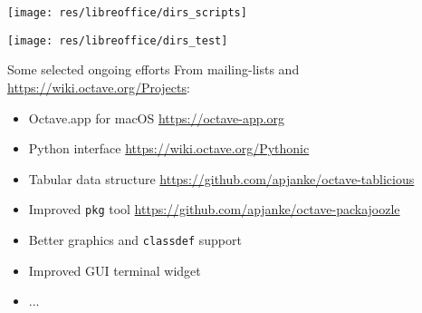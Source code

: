 \begin{frame}
\begin{center}
\texttt{[image: res/libreoffice/dirs\_scripts]}
\end{center}
\end{frame}


\begin{frame}
\begin{center}
\texttt{[image: res/libreoffice/dirs\_test]}
\end{center}
\end{frame}


\begin{frame}{Some selected ongoing efforts}
From mailing-lists
and {\color{DarkBlue}\url{https://wiki.octave.org/Projects}}:\\[1em]
\begin{itemize}
\itemsep1em
\item
Octave.app for macOS
\hfill{\scriptsize\color{DarkBlue} \url{https://octave-app.org}}
\item
Python interface
\hfill{\scriptsize\color{DarkBlue} \url{https://wiki.octave.org/Pythonic}}
\item
Tabular data structure
\hfill{\scriptsize\color{DarkBlue}
\url{https://github.com/apjanke/octave-tablicious}}
\item
Improved \texttt{pkg} tool
\hfill{\scriptsize\color{DarkBlue}
\url{https://github.com/apjanke/octave-packajoozle}}
\item
Better graphics and \texttt{classdef} support
\item
Improved GUI terminal widget
\item
...
\end{itemize}
\end{frame}
